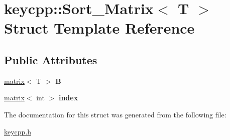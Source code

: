 \hypertarget{structkeycpp_1_1_sort___matrix}{\section{keycpp\-:\-:Sort\-\_\-\-Matrix$<$ T $>$ Struct Template Reference}
\label{structkeycpp_1_1_sort___matrix}
}
\subsection*{Public Attributes}
\begin{DoxyCompactItemize}
\item 
\hypertarget{structkeycpp_1_1_sort___matrix_acd2c90a02e9c57964fd924d75eece798}{\hyperlink{classkeycpp_1_1matrix}{matrix}$<$ T $>$ {\bfseries B}}\label{structkeycpp_1_1_sort___matrix_acd2c90a02e9c57964fd924d75eece798}

\item 
\hypertarget{structkeycpp_1_1_sort___matrix_a25b1c5bb53ac4992d5698c02f56223bb}{\hyperlink{classkeycpp_1_1matrix}{matrix}$<$ int $>$ {\bfseries index}}\label{structkeycpp_1_1_sort___matrix_a25b1c5bb53ac4992d5698c02f56223bb}

\end{DoxyCompactItemize}


The documentation for this struct was generated from the following file\-:\begin{DoxyCompactItemize}
\item 
\hyperlink{keycpp_8h}{keycpp.\-h}\end{DoxyCompactItemize}
